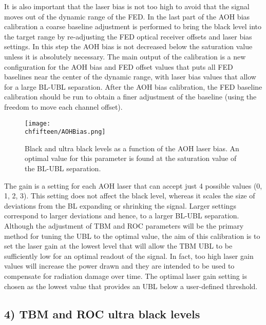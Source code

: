 It is also important that the laser bias is not too high to avoid that the signal moves out of the dynamic range of the FED.
In the last part of the AOH bias calibration a coarse baseline adjustment is performed to bring the black level into the target range by re-adjusting the FED optical receiver offsets and laser bias settings.
In this step the AOH bias is not decreased below the saturation value unless it is absolutely necessary.
The main output of the calibration is a new configuration for the AOH bias and FED offset values that puts all FED baselines near the center of the dynamic range, with laser bias values that allow for a large BL-UBL separation.
After the AOH bias calibration, the FED baseline calibration should be run to obtain a finer adjustment of the baseline (using the freedom to move each channel offset).

\begin{figure}[!htb]
 \begin{center}
 \texttt{[image: \\chfifteen/AOHBias.png]}
 \end{center}
 \caption{Black and ultra black levels as a function of the AOH laser bias. An optimal value for this parameter is found at the saturation value of the BL-UBL separation.}
 \label{fig:AOHBias}
\end{figure}

The gain is a setting for each AOH laser that can accept just 4 possible values (0, 1, 2, 3).
This setting does not affect the black level, whereas it scales the size of deviations from the BL expanding or shrinking the signal.
Larger settings correspond to larger deviations and hence, to a larger BL-UBL separation.
Although the adjustment of TBM and ROC parameters will be the primary method for tuning the UBL to the optimal value, 
the aim of this calibration is to set the laser gain at the lowest level that will allow the TBM UBL to be sufficiently low for an optimal readout of the signal.
In fact, too high laser gain values will increase the power drawn and they are intended to be used to compensate for radiation damage over time.
The optimal laser gain setting is chosen as the lowest value that provides an UBL below a user-defined threshold.

\subsection*{4) TBM and ROC ultra black levels}

